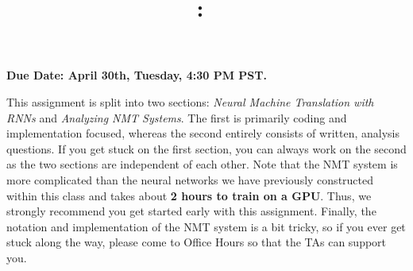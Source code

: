 \documentclass[answers]{exam}
\title{
\vspace{-1in}
\textmd{\textbf{\hmwkClass:\ \hmwkTitle} \\ \hmwkAuthorName}
}
\author{}
\date{}
\begin{document}
\maketitle
\vspace{-.5in}
\textbf{Due Date: April 30th, Tuesday, 4:30 PM PST.}


This assignment is split into two sections: \textit{Neural Machine Translation with RNNs} and \textit{Analyzing NMT Systems}. The first is primarily coding and implementation focused, whereas the second entirely consists of written, analysis questions. If you get stuck on the first section, you can always work on the second as the two sections are independent of each other. Note that the NMT system is more complicated than the neural networks we have previously constructed within this class and takes about \textbf{2 hours to train on a GPU}. Thus, we strongly recommend you get started early with this assignment. Finally, the notation and implementation of the NMT system is a bit tricky, so if you ever get stuck along the way, please come to Office Hours so that the TAs can support you. \newline

\begin{questions}
    
    
\end{questions}






\end{document}
